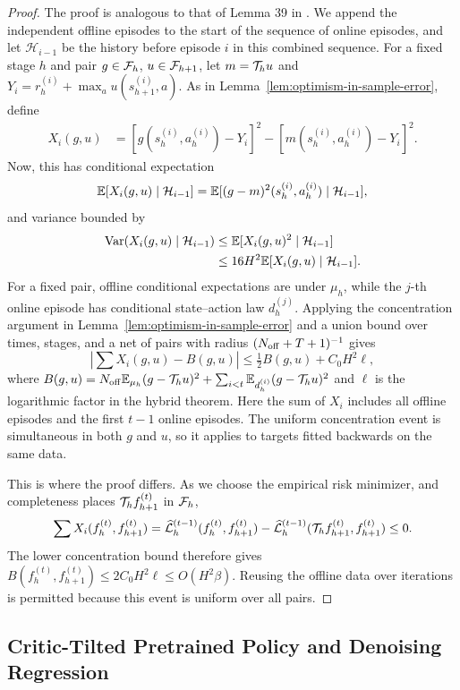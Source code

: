 \begin{proof}
The proof is analogous to that of Lemma 39 in \citet{jin2021bellmaneluder}. We append the independent offline episodes to the start of the sequence of online episodes, and let $\mathcal H_{i-1}$ be the history before episode $i$ in this combined sequence. For a fixed stage $h$ and pair $g\in{\mathcal{F}}_h$, $u\in{\mathcal{F}}_{h+1}$, let $m={\mathcal{T}}_hu$ and $Y_i=r_h^{(i)}+\max_a u(s_{h+1}^{(i)},a)$. As in Lemma~\ref{lem:optimism-in-sample-error}, define
\begin{align}
 X_i(g,u)
 &=[g(s_h^{(i)},a_h^{(i)})-Y_i]^2
   -[m(s_h^{(i)},a_h^{(i)})-Y_i]^2.
 \label{eq:err-control-alg-4-1}
\end{align}
Now, this has conditional expectation
\[
 \mathbb{E}[X_i(g,u)\mid\mathcal H_{i-1}]
 =\mathbb{E}[(g-m)^2(s_h^{(i)},a_h^{(i)})\mid\mathcal H_{i-1}],
\]
and variance bounded by
\begin{align*}
 \operatorname{Var}(X_i(g,u)\mid\mathcal H_{i-1})
 &\leq\mathbb{E}[X_i(g,u)^2\mid\mathcal H_{i-1}]\\
 &\leq16H^2\mathbb{E}[X_i(g,u)\mid\mathcal H_{i-1}].
\end{align*}
For a fixed pair, offline conditional expectations are under $\mu_h$, while the $j$-th online episode has conditional state--action law $d_h^{(j)}$. Applying the concentration argument in Lemma~\ref{lem:optimism-in-sample-error} and a union bound over times, stages, and a net of pairs with radius $(N_{{\operatorname{off}}}+T+1)^{-1}$ gives
\[
 \left|\sum X_i(g,u)-B(g,u)\right|\le\tfrac12 B(g,u)+C_0H^2\ell,
\]
where $B(g,u)=N_{{\operatorname{off}}}\mathbb{E}_{\mu_h}(g-{\mathcal{T}}_hu)^2+\sum_{i<t}\mathbb{E}_{d_h^{(i)}}(g-{\mathcal{T}}_hu)^2$ and $\ell$ is the logarithmic factor in the hybrid theorem. Here the sum of $X_i$ includes all offline episodes and the first $t-1$ online episodes. The uniform concentration event is simultaneous in both $g$ and $u$, so it applies to targets fitted backwards on the same data.

This is where the proof differs. As we choose the empirical risk minimizer, and completeness places ${\mathcal{T}}_hf_{h+1}^{(t)}$ in ${\mathcal{F}}_h$,
\[
 \sum X_i(f_h^{(t)},f_{h+1}^{(t)})
 =\widehat{{\mathcal{L}}}_h^{(t-1)}(f_h^{(t)},f_{h+1}^{(t)})
  -\widehat{{\mathcal{L}}}_h^{(t-1)}({\mathcal{T}}_hf_{h+1}^{(t)},f_{h+1}^{(t)})\le0.
\]
The lower concentration bound therefore gives $B(f_h^{(t)},f_{h+1}^{(t)})\le2C_0H^2\ell\le O(H^2\beta)$. Reusing the offline data over iterations is permitted because this event is uniform over all pairs.
\end{proof}


\subsection{Critic-Tilted Pretrained Policy and Denoising Regression}
\label{app:pretrained-gibbs-bc}
\label{prop:gibbs-cloning}
\label{app:favorable-actions}
\label{app:gibbs-neural-fitting}
\label{prop:gibbs-neural-fit}
\label{eq:gibbs-neural-fit}
\label{lem:gibbs-neural-sampler}
\label{eq:gibbs-neural-W1}
\label{cor:gibbs-softmax-approximation}

